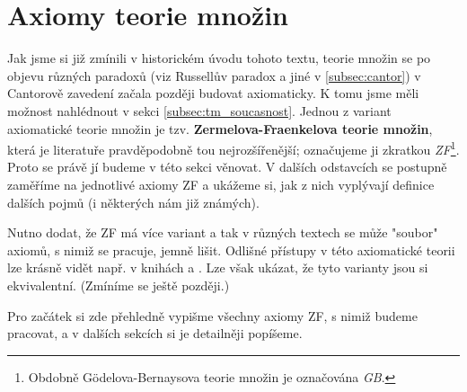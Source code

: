 \chapter{Axiomy teorie množin}\label{sec:axiomy_tm}
Jak jsme si již zmínili v historickém úvodu tohoto textu, teorie množin se po objevu různých paradoxů (viz Russellův paradox a jiné v \ref{subsec:cantor}) v Cantorově zavedení začala později budovat axiomaticky. K tomu jsme měli možnost nahlédnout v sekci \ref{subsec:tm_soucasnost}. Jednou z variant axiomatické teorie množin je tzv. \textbf{Zermelova-Fraenkelova teorie množin}, která je literatuře pravděpodobně tou nejrozšířenější; označujeme ji zkratkou \emph{ZF}\footnote{Obdobně Gödelova-Bernaysova teorie množin je označována \emph{GB}.}. Proto se právě jí budeme v této sekci věnovat. V dalších odstavcích se postupně zaměříme na jednotlivé axiomy ZF a ukážeme si, jak z nich vyplývají definice dalších pojmů (i některých nám již známých).\par
Nutno dodat, že ZF má více variant a tak v různých textech se může "soubor" axiomů, s nimiž se pracuje, jemně lišit. Odlišné přístupy v této axiomatické teorii lze krásně vidět např. v knihách \cite{BalcarStepanek1986} a \cite{Goldrei2017}. Lze však ukázat, že tyto varianty jsou si ekvivalentní. (Zmíníme se ještě později.)\par
Pro začátek si zde přehledně vypišme všechny axiomy ZF, s nimiž budeme pracovat, a v dalších sekcích si je detailněji popíšeme.
\medskip

